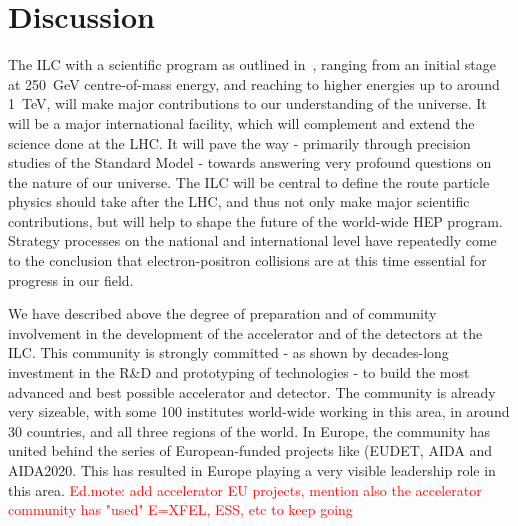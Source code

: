 \documentclass[%
 reprint,
 floatfix,
 amsmath,amssymb,
 aps,
]{revtex4-1}
\begin{document}
\section{\label{sec:discussion}Discussion}
The ILC with a scientific program as outlined in~\cite{ILCESU1}, ranging from 
an initial stage at 250~GeV centre-of-mass energy, and reaching to higher 
energies up to around 1~TeV, will make major contributions to our understanding of the universe. It will be a major international facility, which will 
complement and extend the science done at the LHC. It will pave the way - 
primarily through precision studies of the Standard Model - towards answering 
very profound questions on the nature of our universe. The ILC will be central to 
define the route particle physics should take after the LHC, and thus not only 
make major scientific contributions, but will help to shape the future of the 
world-wide HEP program. Strategy processes on the national and 
international level have repeatedly come to the conclusion that electron-positron collisions 
are at this time essential for progress in our field. 


We have described above the degree of preparation and of community involvement 
in the development of the accelerator and of the detectors at the ILC. This 
community is strongly committed - as shown by decades-long investment in the 
R\&D and prototyping of technologies - to build the most advanced and best 
possible accelerator and detector. The community is already very sizeable, with 
some 100 institutes world-wide working in this area, in around 30 countries, and 
all three regions of the world. In Europe, the community has united behind the 
series of  European-funded projects like (EUDET, AIDA and AIDA2020. This has 
resulted in Europe playing a very visible leadership role in this area. 
\textcolor{red}{Ed.mote: add accelerator EU projects, mention also the accelerator community has "used" E=XFEL, ESS, etc to keep going}


\end{document}
